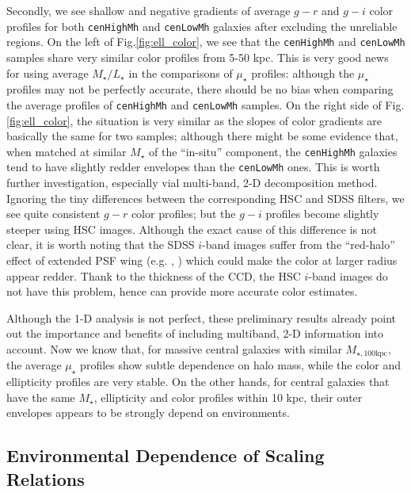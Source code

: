 \documentclass{emulateapj}
\def\rbcg{\texttt{cenHighMh}}
\def\nbcg{\texttt{cenLowMh}}
\def\mstar{{$M_{\star}$}}
\def\mtot{{$M_{\star,100\mathrm{kpc}}$}}
\def\m2l{{$M_{\star}/L_{\star}$}}
\def\mden{{$\mu_{\star}$}}
\newcommand{\update}[1]{\textcolor{Bittersweet}{#1}}
\begin{document}
\begin{CJK*}{UTF8}{gbsn}
    \update{ 
    Secondly, we see shallow and negative gradients of average $g-r$ and $g-i$ color 
    profiles for both \rbcg{} and \nbcg{} galaxies after excluding the unreliable 
    regions. 
    On the left of Fig.\ref{fig:ell_color}, we see that the \rbcg{} and \nbcg{} 
    samples share very similar color profiles from 5-50 kpc. 
    This is very good news for using average \m2l{} in the comparisons of \mden{}
    profiles: although the \mden{} profiles may not be perfectly accurate, there 
    should be no bias when comparing the average profiles of \rbcg{} and \nbcg{} 
    samples.
    On the right side of Fig.\ref{fig:ell_color}, the situation is very similar 
    as the slopes of color gradients are basically the same for two samples; 
    although there might be some evidence that, when matched at similar \mstar{} 
    of the ``in-situ'' component, the \rbcg{} galaxies tend to have slightly redder
    envelopes than the \nbcg{} ones. 
    This is worth further investigation, especially vial multi-band, 2-D 
    decomposition method. 
    Ignoring the tiny differences between the corresponding HSC and SDSS filters, 
    we see quite consistent $g-r$ color profiles; but the $g-i$ profiles become 
    slightly steeper using HSC images. 
    Although the exact cause of this difference is not clear, it is worth noting that
    the SDSS $i$-band images suffer from the ``red-halo'' effect of extended PSF 
    wing (e.g. \citealt{Wu2005}, \citealt{Tal2011}) which could make the color 
    at larger radius appear redder.
    Thank to the thickness of the CCD, the HSC $i$-band images do not have this 
    problem, hence can provide more accurate color estimates.
    }

    \update{
    Although the 1-D analysis is not perfect, these preliminary results already 
    point out the importance and benefits of including multiband, 2-D information 
    into account. 
    Now we know that, for massive central galaxies with similar \mtot{}, the average 
    \mden{} profiles show subtle dependence on halo mass, while the color and 
    ellipticity profiles are very stable.  
    On the other hands, for central galaxies that have the same \mstar{}, ellipticity 
    and color profiles within 10 kpc, their outer envelopes appears to be strongly 
    depend on environments. 
    }
    

\subsection{Environmental Dependence of Scaling Relations}
    \label{ssec:scaling}


\end{CJK*}
\end{document}
